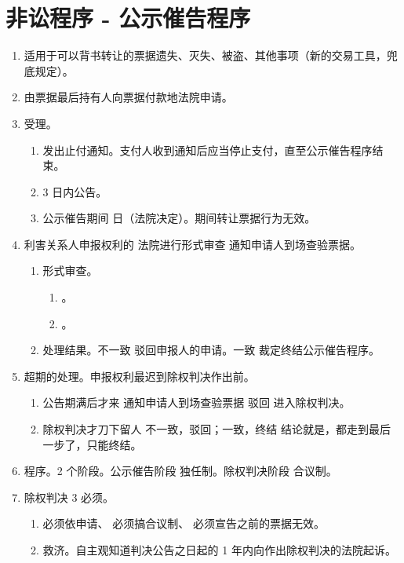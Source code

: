 \section{非讼程序 - 公示催告程序}
\begin{enumerate}
  \item 适用于可以背书转让的票据遗失、灭失、被盗、其他事项（新的交易工具，兜底规定）。
  \item 由票据最后持有人向票据付款地法院申请。
  \item 受理。
        \begin{enumerate}
          \item 发出止付通知。支付人收到通知后应当停止支付，直至公示催告程序结束。
          \item 3 日内公告。
          \item 公示催告期间  日（法院决定）。期间转让票据行为无效。
        \end{enumerate}
  \item 利害关系人申报权利的 \yjt 法院进行形式审查 \yjt 通知申请人到场查验票据。
        \begin{enumerate}
          \item 形式审查。
                \begin{enumerate}
                  \item {}。
                  \item {}。
                \end{enumerate}
          \item 处理结果。\yi 不一致 \yjt 驳回申报人的申请。\er 一致 \yjt 裁定终结公示催告程序。
        \end{enumerate}
  \item 超期的处理。申报权利最迟到除权判决作出前。
        \begin{enumerate}
          \item 公告期满后才来 \yjt 通知申请人到场查验票据 \yjt 驳回 \hz 进入除权判决。
          \item 除权判决才刀下留人 \yjt 不一致，驳回；一致，终结 \yjt 结论就是，都走到最后一步了，只能终结。
        \end{enumerate}
  \item 程序。2 个阶段。\yi 公示催告阶段 \yjt 独任制。\er 除权判决阶段 \yjt 合议制。
  \item 除权判决 3 必须。
        \begin{enumerate}
          \item 必须依申请、 必须搞合议制、 必须宣告之前的票据无效。
          \item 救济。自主观知道判决公告之日起的 1 年内向作出除权判决的法院起诉。
        \end{enumerate}
\end{enumerate}
